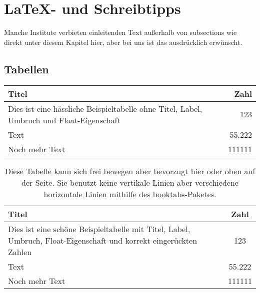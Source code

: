 \chapter{\LaTeX{}- und Schreibtipps}
Manche Institute verbieten einleitenden Text außerhalb von subsections wie direkt unter diesem Kapitel hier, aber bei uns ist das ausdrücklich erwünscht.

\section{Tabellen}

\begin{tabular}{|l|r|}
\hline
Titel									&Zahl\\
\hline
Dies ist eine hässliche Beispieltabelle	ohne Titel, Label, Umbruch und Float-Eigenschaft &123\\
Text									&55.222\\
Noch mehr Text							&111111\\
\hline
\end{tabular}

\begin{table}[ht]
\begin{tabulary}{\textwidth}{LS}
\toprule
Titel									&Zahl\\
\midrule
Dies ist eine schöne Beispieltabelle mit Titel, Label, Umbruch, Float-Eigenschaft und korrekt eingerückten Zahlen	&123\\
Text																												&55.222\\
Noch mehr Text																										&111111\\
\bottomrule
\end{tabulary}
\caption{Diese Tabelle kann sich frei bewegen aber bevorzugt hier oder oben auf der Seite. Sie benutzt keine vertikale Linien aber verschiedene horizontale Linien mithilfe des booktabs-Paketes.}
\label{tab:exampletable}
\end{table}


